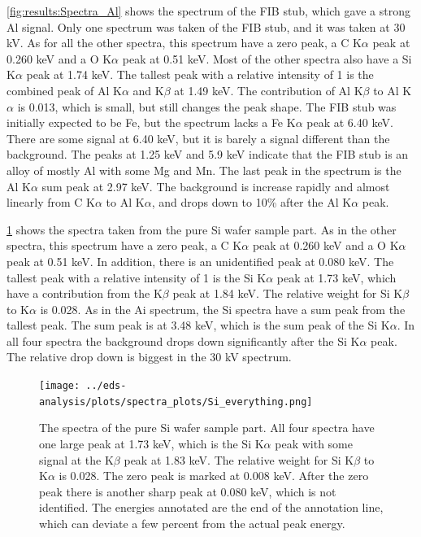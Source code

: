\cref{fig:results:Spectra_Al} shows the spectrum of the FIB stub, which gave a strong Al signal.
Only one spectrum was taken of the FIB stub, and it was taken at 30 kV.
As for all the other spectra, this spectrum have a zero peak, a C K$\alpha$ peak at 0.260 keV and a O K$\alpha$ peak at 0.51 keV.
Most of the other spectra also have a Si K$\alpha$ peak at 1.74 keV.
The tallest peak with a relative intensity of 1 is the combined peak of Al K$\alpha$ and K$\beta$ at 1.49 keV.
The contribution of Al K$\beta$ to Al K$\alpha$ is 0.013, which is small, but still changes the peak shape.
The FIB stub was initially expected to be Fe, but the spectrum lacks a Fe K$\alpha$ peak at 6.40 keV.
There are some signal at 6.40 keV, but it is barely a signal different than the background.
The peaks at 1.25 keV and 5.9 keV indicate that the FIB stub is an alloy of mostly Al with some Mg and Mn.
The last peak in the spectrum is the Al K$\alpha$ sum peak at 2.97 keV. %
The background is increase rapidly and almost linearly from C K$\alpha$ to Al K$\alpha$, and drops down to 10\% after the Al K$\alpha$ peak.



\cref{fig:results:Spectra_Si} shows the spectra taken from the pure Si wafer sample part.
As in the other spectra, this spectrum have a zero peak, a C K$\alpha$ peak at 0.260 keV and a O K$\alpha$ peak at 0.51 keV.
In addition, there is an unidentified peak at 0.080 keV.
The tallest peak with a relative intensity of 1 is the Si K$\alpha$ peak at 1.73 keV, which have a contribution from the K$\beta$ peak at 1.84 keV.
The relative weight for Si K$\beta$ to K$\alpha$ is 0.028.
As in the Ai spectrum, the Si spectra have a sum peak from the tallest peak.
The sum peak is at 3.48 keV, which is the sum peak of the Si K$\alpha$.
In all four spectra the background drops down significantly after the Si K$\alpha$ peak.
The relative drop down is biggest in the 30 kV spectrum.

\begin{figure}[h]
    \centering
    \texttt{[image: ../eds-analysis/plots/spectra\_plots/Si\_everything.png]}
    \caption{
        The spectra of the pure Si wafer sample part.
        All four spectra have one large peak at 1.73 keV, which is the Si K$\alpha$ peak with some signal at the K$\beta$ peak at 1.83 keV.
        The relative weight for Si K$\beta$ to K$\alpha$ is 0.028.
        The zero peak is marked at 0.008 keV.
        After the zero peak there is another sharp peak at 0.080 keV, which is not identified.
        The energies annotated are the end of the annotation line, which can deviate a few percent from the actual peak energy.
    }
    \label{fig:results:Spectra_Si}
\end{figure}


